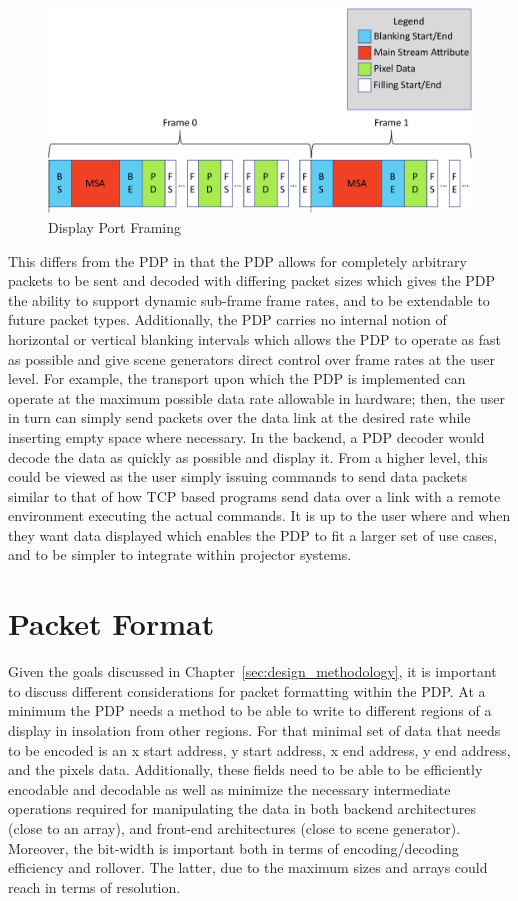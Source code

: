     \begin{figure}
        \centering
        \includegraphics[width=1.0\textwidth]{fig/display_port_framing.pdf}
        \caption{Display Port Framing}
        \label{fig:display_port_framing}
    \end{figure}

    This differs from the PDP in that the PDP allows for completely arbitrary packets to be sent and decoded with differing packet sizes which gives the PDP the ability to support dynamic sub-frame frame rates, and to be extendable to future packet types. Additionally, the PDP carries no internal notion of horizontal or vertical blanking intervals which allows the PDP to operate as fast as possible and give scene generators direct control over frame rates at the user level. For example, the transport upon which the PDP is implemented can operate at the maximum possible data rate allowable in hardware; then, the user in turn can simply send packets over the data link at the desired rate while inserting empty space where necessary. In the backend, a PDP decoder would decode the data as quickly as possible and display it. From a higher level, this could be viewed as the user simply issuing commands to send data packets similar to that of how TCP based programs send data over a link with a remote environment executing the actual commands. It is up to the user where and when they want data displayed which enables the PDP to fit a larger set of use cases, and to be simpler to integrate within projector systems.

\section{Packet Format}
    \label{sec:packet_format}
    Given the goals discussed in Chapter~\ref{sec:design_methodology}, it is important to discuss different considerations for packet formatting within the PDP. At a minimum the PDP needs a method to be able to write to different regions of a display in insolation from other regions. For that minimal set of data that needs to be encoded is an x start address, y start address, x end address, y end address, and the pixels data. Additionally, these fields need to be able to be efficiently encodable and decodable as well as minimize the necessary intermediate operations required for manipulating the data in both backend architectures (close to an array), and front-end architectures (close to scene generator). Moreover, the bit-width is important both in terms of encoding/decoding efficiency and rollover. The latter, due to the maximum sizes and arrays could reach in terms of resolution.

